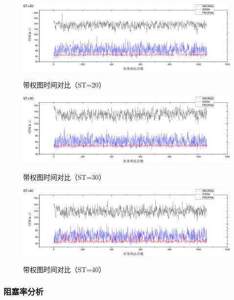\begin{figure}
\setlength{\belowcaptionskip}{-0.5cm}
\begin{center}
{\includegraphics[width=1 \textwidth]{figures/H20T.pdf}}
\end{center}
\caption{{\footnotesize{带权图时间对比（ST=20）}}}
\label{H20T}
\end{figure}
\begin{figure}
\setlength{\belowcaptionskip}{-0.5cm}
\begin{center}
{\includegraphics[width=1 \textwidth]{figures/H30T.pdf}}
\end{center}
\caption{{\footnotesize{带权图时间对比（ST=30）}}}
\label{H30T}
\end{figure}
\begin{figure}
\setlength{\belowcaptionskip}{-0.5cm}
\begin{center}
{\includegraphics[width=1 \textwidth]{figures/H40T.pdf}}
\end{center}
\caption{{\footnotesize{带权图时间对比（ST=40）}}}
\label{H40T}
\end{figure}
\subsubsection{阻塞率分析}


